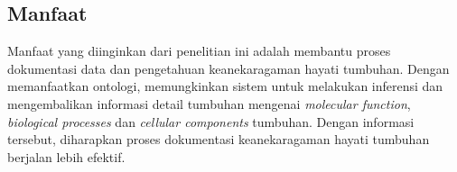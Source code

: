 \subsection*{Manfaat}
Manfaat yang diinginkan dari penelitian ini adalah membantu proses dokumentasi data dan pengetahuan keanekaragaman hayati tumbuhan. Dengan memanfaatkan ontologi, memungkinkan sistem untuk melakukan inferensi dan mengembalikan informasi detail tumbuhan mengenai \textit{molecular function}, \textit{biological processes} dan \textit{cellular components} tumbuhan. Dengan informasi tersebut, diharapkan proses dokumentasi keanekaragaman hayati tumbuhan berjalan lebih efektif.

